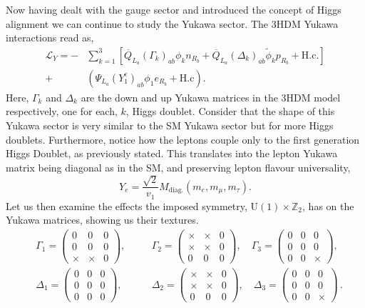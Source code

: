 \documentclass[10pt]{report}
\begin{document}
Now having dealt with the gauge sector and introduced the concept of Higgs alignment we can continue to study the Yukawa sector. The 3HDM Yukawa interactions read as,
%
\begin{equation} 
\label{eq:3HDM_Yuk} 
\begin{split} 
\mathcal{L}_Y = - & \sum_{k=1}^3 \left[ \overline{Q}_{L_a} \left( \Gamma_k \right)_{ab} \phi_k n_{R_b} + \overline{Q}_{L_a} \left( \Delta_k \right)_{ab} \tilde{\phi}_k p_{R_b} + \text{H.c}.  \right] \\ + & \left( \Psi_{L_a} \left( Y^e_1 \right)_{ab} \phi_1 e_{R_b} + \text{H.c} \right) .
\end{split} 
\end{equation} 
%
Here, $\Gamma_k$ and $\Delta_k$ are the down and up Yukawa matrices in the 3HDM model respectively, one for each, $k$, Higgs doublet. 
%
Consider that the shape of this Yukawa sector is very similar to the SM Yukawa sector but for more Higgs doublets. Furthermore, notice how the leptons couple only to the first generation Higgs Doublet, as previously stated. 
%
This translates into the lepton Yukawa matrix being diagonal as in the SM, and preserving lepton flavour universality, 
%
\begin{equation}
Y_e = \frac{\sqrt{2}}{v_1} M_{\text{diag.}}\left( m_e , m_\mu , m_\tau \right) .
\end{equation} 
%
Let us then examine the effects the imposed symmetry, $\mathrm{U}(1)\times\mathbb{Z}_2$, has on the Yukawa matrices, showing us their textures.  
%
\begin{equation}
\begin{aligned}
\label{Lovely_Equations}
&\Gamma_1  = \begin{pmatrix}
0 & 0 & 0\\
0 & 0 & 0\\
\times & \times & 0
\end{pmatrix}, \quad 
&&\Gamma_2  = \begin{pmatrix}
\times & \times & 0\\
\times & \times & 0\\
0 & 0 & 0
\end{pmatrix}, \quad
\Gamma_3  = \begin{pmatrix}
0 & 0 & 0\\
0 & 0 & 0\\
0 & 0 & \times
\end{pmatrix}, \\[1em]
&\Delta_1  = \begin{pmatrix}
0 & 0 & 0\\
0 & 0 & 0\\
0 & 0 & 0
\end{pmatrix}, \quad 
&&\Delta_2 = \begin{pmatrix}
\times & \times & 0\\
\times & \times & 0\\
0 & 0 & 0
\end{pmatrix} , \quad 
\Delta_3 = \begin{pmatrix}
0 & 0 & 0\\
0 & 0 & 0\\
0 & 0 & \times
\end{pmatrix}  \, . 
\end{aligned} 
\end{equation}
\end{document}
